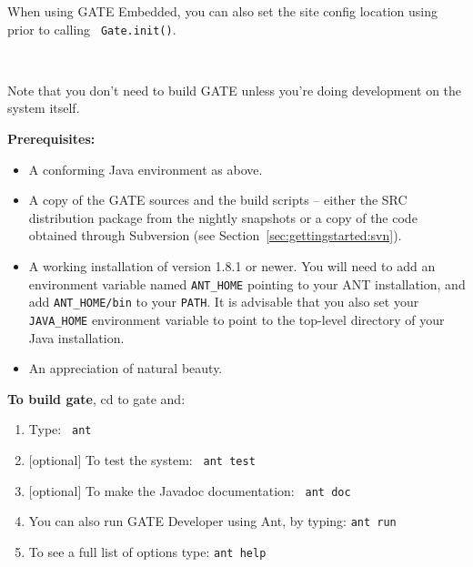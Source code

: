 When using GATE Embedded, you can also set the site config location
using prior to calling {\tt
Gate.init()}.





\mbox{ }

Note that you don't need to build GATE unless you're doing development
on the system itself.

{\bf Prerequisites:}
\begin{itemize}
\item
A conforming Java environment as above.
\item
A copy of the GATE sources and the build scripts -- either the SRC distribution 
package from the nightly snapshots or a copy of the code
obtained through Subversion (see Section~\ref{sec:gettingstarted:svn}).
\item 
A working installation of  version
1.8.1 or newer. You will need to add an environment variable named
\verb!ANT_HOME! pointing to your ANT installation, and add \verb!ANT_HOME/bin!
to your {\tt PATH}. It is advisable that you also set your \verb!JAVA_HOME!
environment variable to point to the top-level directory of your Java
installation.
\item
An appreciation of natural beauty.
\end{itemize}

{\bf To build gate}, cd to gate and: 
\begin{enumerate}
\item
Type: {\tt \newline
ant
}
\item
$[$optional$]$ To test the system:
{\tt \newline
ant test\newline
}
\item
$[$optional$]$ To make the Javadoc documentation:
{\tt \newline
ant doc\newline
}
\item
You can also run GATE Developer using Ant, by typing:\newline
{\tt ant run}
\item
To see a full list of options type: {\tt ant help}\newline
\end{enumerate}

